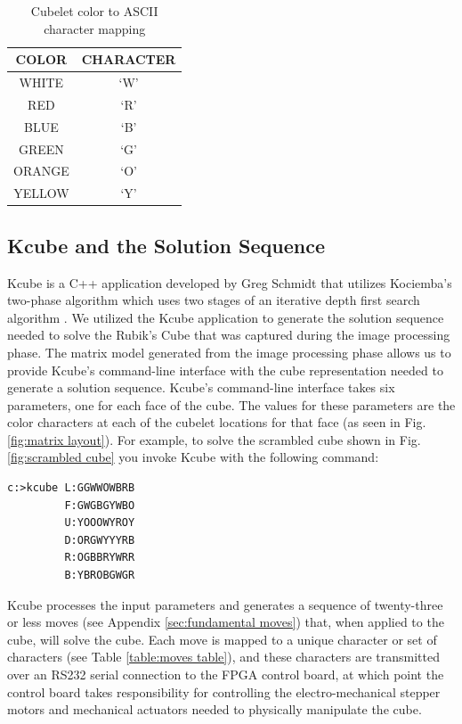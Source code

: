\documentclass[final, letterpaper, 10 pt, conference, twocolumn]{IEEEtran}
\begin{document}
\begin{table}[!ht]
\caption{Cubelet color to ASCII character mapping}
\label{table:cubelet representation}
\centering
\begin{tabular}{|c|c|}
\hline
\textbf{COLOR} & \textbf{CHARACTER} \\ \hline
WHITE          & `W'              \\ \hline
RED            & `R'              \\ \hline
BLUE           & `B'              \\ \hline
GREEN          & `G'              \\ \hline
ORANGE         & `O'              \\ \hline
YELLOW         & `Y'              \\ \hline
\end{tabular}
\end{table}

\subsection{Kcube and the Solution Sequence}
\label{sec:Kcube}
Kcube is a C++ application developed by Greg Schmidt that utilizes Kociemba's two-phase algorithm which uses two stages of an iterative depth first search algorithm \cite{TheTwo-PhaseAlgorithm}. We utilized the Kcube application to generate the solution sequence needed to solve the Rubik's Cube that was captured during the image processing phase. The matrix model generated from the image processing phase allows us to provide Kcube's command-line interface with the cube representation needed to generate a solution sequence. Kcube's command-line interface takes six parameters, one for each face of the cube. The values for these parameters are the color characters at each of the cubelet locations for that face (as seen in Fig. \ref{fig:matrix layout}). For example, to solve the scrambled cube shown in Fig. \ref{fig:scrambled cube} you invoke Kcube with the following command:

\begin{lstlisting}[style=DOS]
c:>kcube L:GGWWOWBRB
         F:GWGBGYWBO
         U:YOOOWYROY
         D:ORGWYYYRB
         R:OGBBRYWRR
         B:YBROBGWGR
\end{lstlisting}

Kcube processes the input parameters and generates a sequence of twenty-three or less moves (see Appendix \ref{sec:fundamental moves}) that, when applied to the cube, will solve the cube. Each move is mapped to a unique character or set of characters (see Table \ref{table:moves table}), and these characters are transmitted over an RS232 serial connection to the FPGA control board, at which point the control board takes responsibility for controlling the electro-mechanical stepper motors and mechanical actuators needed to physically manipulate the cube.
\end{document}

